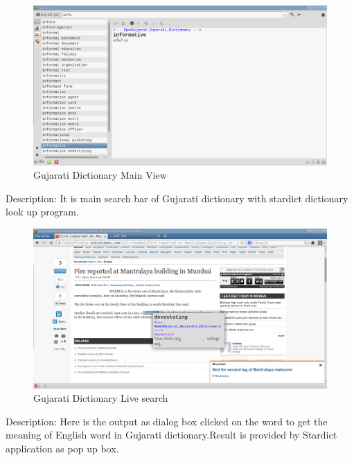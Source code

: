 \newpage
\begin{figure}[h]
\begin{center}
  \includegraphics[scale=0.33] {14.png}
  \caption[Screenshot - Gujarati Dictionary]{Gujarati Dictionary Main View}
\end{center}
\end{figure}
Description: It is main search bar of Gujarati dictionary with stardict dictionary look up program.
\newpage

\begin{figure}[h]
\begin{center}
  \includegraphics[scale=0.33] {15.png}
  \caption[Screenshot - Gujarati Dictionary Live search]{Gujarati Dictionary Live search}
\end{center}
\end{figure}
Description: Here is the output as dialog box clicked on the word to get the meaning of English word in Gujarati dictionary.Result is provided by Stardict application as pop up box.

